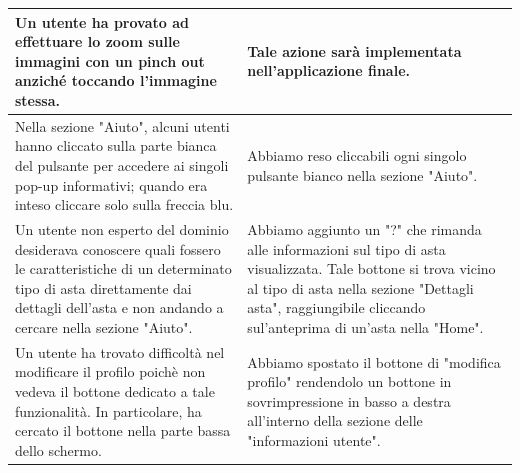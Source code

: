\begin{center}
\begin{tabular}{|C{7.35cm}|C{7.35cm}|}
                \hline
                    Un utente ha provato ad effettuare lo zoom sulle immagini con un pinch out anziché toccando l’immagine stessa. & 
                    Tale azione sarà implementata nell'applicazione finale.\\
                \hline
                    Nella sezione "Aiuto", alcuni utenti hanno cliccato sulla parte bianca del pulsante per accedere ai singoli pop-up informativi; quando era inteso cliccare solo sulla freccia blu. &
                    Abbiamo reso cliccabili ogni singolo pulsante bianco nella sezione "Aiuto".\\
                \hline
                    Un utente non esperto del dominio desiderava conoscere quali fossero le caratteristiche di un determinato tipo di asta direttamente dai dettagli dell'asta e non andando a cercare nella sezione "Aiuto". &
                    Abbiamo aggiunto un "?" che rimanda alle informazioni sul tipo di asta visualizzata. Tale bottone si trova vicino al tipo di asta nella sezione "Dettagli asta", raggiungibile cliccando sul'anteprima di un'asta nella "Home".\\
                \hline
                    Un utente ha trovato difficoltà nel modificare il profilo poichè non vedeva il bottone dedicato a tale funzionalità. In particolare, ha cercato il bottone nella parte bassa dello schermo. &
                    Abbiamo spostato il bottone di "modifica profilo" rendendolo un bottone in sovrimpressione in basso a destra all'interno della sezione delle "informazioni utente". \\
                \hline
            \end{tabular}
            \end{center}